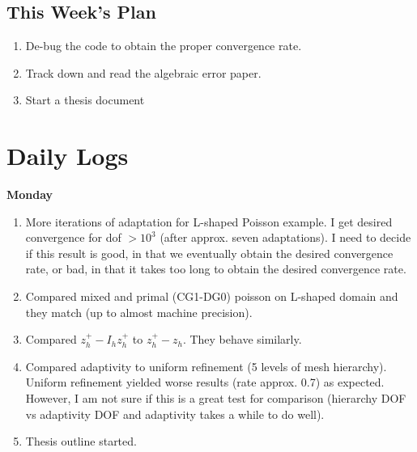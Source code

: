 \documentclass[12pt,a4paper]{article}
\begin{document}
\subsection{This Week's Plan}
\begin{enumerate}
    \item De-bug the code to obtain the proper convergence rate.
    \item Track down and read the algebraic error paper.
    \item Start a thesis document
\end{enumerate}



\section{Daily Logs}


\textbf{Monday}
\begin{enumerate}
    \item More iterations of adaptation for L-shaped Poisson example. I get desired convergence for dof $> 10^3$ (after approx. seven adaptations). I need to decide if this result is good, in that we eventually obtain the desired convergence rate, or bad, in that it takes too long to obtain the desired convergence rate. 
    \item Compared mixed and primal (CG1-DG0) poisson on L-shaped domain and they match (up to almost machine precision).
    \item Compared $z_h^+ - I_h z_h^+$ to $z_h^+ - z_h.$ They behave similarly.
    \item Compared adaptivity to uniform refinement (5 levels of mesh hierarchy). Uniform refinement yielded worse results (rate approx. 0.7) as expected. However, I am not sure if this is a great test for comparison (hierarchy DOF vs adaptivity DOF and adaptivity takes a while to do well).
    \item Thesis outline started. 
\end{enumerate}
\end{document}
